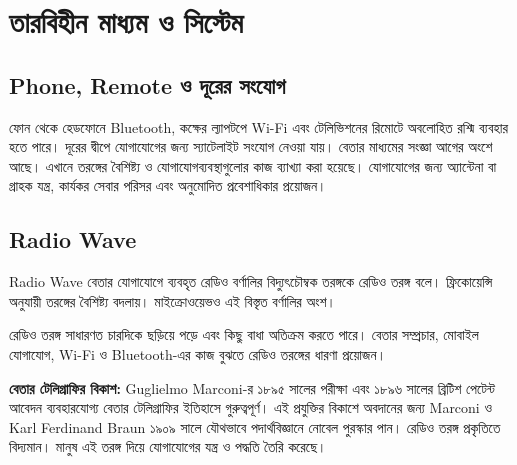 \begingroup
\chTwoReadableTopicStyle
\section{তারবিহীন মাধ্যম ও সিস্টেম}

\subsection{Phone, Remote ও দূরের সংযোগ}
ফোন থেকে হেডফোনে Bluetooth, কক্ষের ল্যাপটপে Wi-Fi এবং টেলিভিশনের রিমোটে অবলোহিত রশ্মি ব্যবহার হতে পারে। দূরের দ্বীপে যোগাযোগের জন্য স্যাটেলাইট সংযোগ নেওয়া যায়। বেতার মাধ্যমের সংজ্ঞা আগের অংশে আছে। এখানে তরঙ্গের বৈশিষ্ট্য ও যোগাযোগব্যবস্থাগুলোর কাজ ব্যাখ্যা করা হয়েছে। যোগাযোগের জন্য অ্যান্টেনা বা গ্রাহক যন্ত্র, কার্যকর সেবার পরিসর এবং অনুমোদিত প্রবেশাধিকার প্রয়োজন।
\subsection{Radio Wave}

\begin{definitionbox}{Radio Wave}
বেতার যোগাযোগে ব্যবহৃত রেডিও বর্ণালির বিদ্যুৎচৌম্বক তরঙ্গকে রেডিও তরঙ্গ বলে। ফ্রিকোয়েন্সি অনুযায়ী তরঙ্গের বৈশিষ্ট্য বদলায়। মাইক্রোওয়েভও এই বিস্তৃত বর্ণালির অংশ।
\end{definitionbox}

রেডিও তরঙ্গ সাধারণত চারদিকে ছড়িয়ে পড়ে এবং কিছু বাধা অতিক্রম করতে পারে। বেতার সম্প্রচার, মোবাইল যোগাযোগ, Wi-Fi ও Bluetooth-এর কাজ বুঝতে রেডিও তরঙ্গের ধারণা প্রয়োজন।

\textbf{বেতার টেলিগ্রাফির বিকাশ:} Guglielmo Marconi-র ১৮৯৫ সালের পরীক্ষা এবং ১৮৯৬ সালের ব্রিটিশ পেটেন্ট আবেদন ব্যবহারযোগ্য বেতার টেলিগ্রাফির ইতিহাসে গুরুত্বপূর্ণ। এই প্রযুক্তির বিকাশে অবদানের জন্য Marconi ও Karl Ferdinand Braun ১৯০৯ সালে যৌথভাবে পদার্থবিজ্ঞানে নোবেল পুরস্কার পান। রেডিও তরঙ্গ প্রকৃতিতে বিদ্যমান। মানুষ এই তরঙ্গ দিয়ে যোগাযোগের যন্ত্র ও পদ্ধতি তৈরি করেছে।




